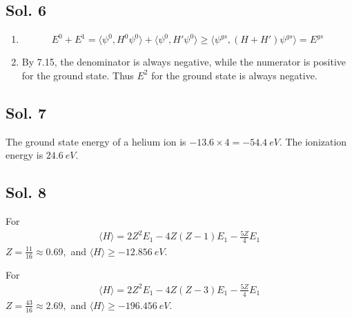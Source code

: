 \subsection*{Sol. 6}
\begin{enumerate}
    \item 
    $$
    E^0 + E^1 = \langle \psi^0, H^0\psi^0\rangle + \langle \psi^0, H'\psi^0\rangle
    \geq 
    \langle \psi^{gs}, (H+H')\psi^{gs}\rangle=E^{gs}
    $$
    \item 
    By 7.15, the denominator is always negative, while the numerator is positive for the ground state. Thus $E^2$ for the ground state is always negative.
\end{enumerate}

\subsection*{Sol. 7}
The ground state energy of a helium ion is $-13.6\times 4= - \qty{54.4}{eV}.$ The ionization energy is $\qty{24.6}{eV}.$


\subsection*{Sol. 8}
For 
\begin{align*}
    \langle H \rangle=2Z^2E_1 -4Z(Z-1)E_1-\frac{5Z}{4}E_1
\end{align*}
$Z = \frac{11}{16}\approx0.69,$ and $\langle H\rangle\geq -\qty{12.856}{eV}.$

For 
\begin{align*}
    \langle H \rangle=2Z^2E_1 -4Z(Z-3)E_1-\frac{5Z}{4}E_1
\end{align*}
$Z = \frac{43}{16}\approx2.69,$ and $\langle H\rangle\geq -\qty{196.456}{eV}.$

